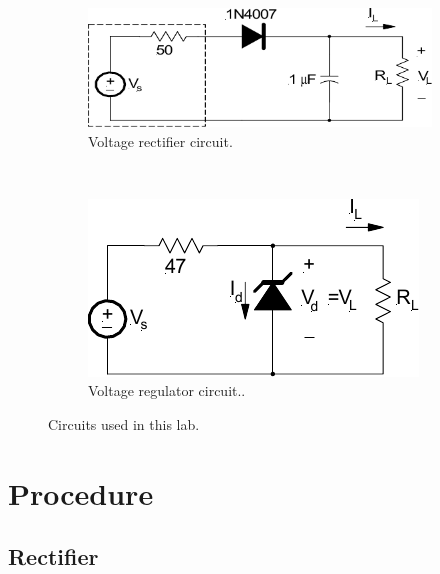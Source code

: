 \documentclass{article}
\begin{document}
\begin{figure}[hbtp]
  \centering
  \begin{subfigure}[b]{0.6\textwidth}
    \includegraphics[width=\textwidth]{volt_rect}
    \caption{\label{fig:volt_rect} Voltage rectifier circuit.}
  \end{subfigure}%
  ~
  \begin{subfigure}[b]{0.4\textwidth}
    \includegraphics[width=\textwidth]{volt_reg}
    \caption{\label{fig:volt_reg} Voltage regulator circuit..}
  \end{subfigure}
  \caption{\label{fig:circuits_tested} Circuits used in this lab.}
\end{figure}

\section{Procedure}
\label{sec:procedure}

\subsection{Rectifier}
\label{sec:rectifier}

\end{document}
